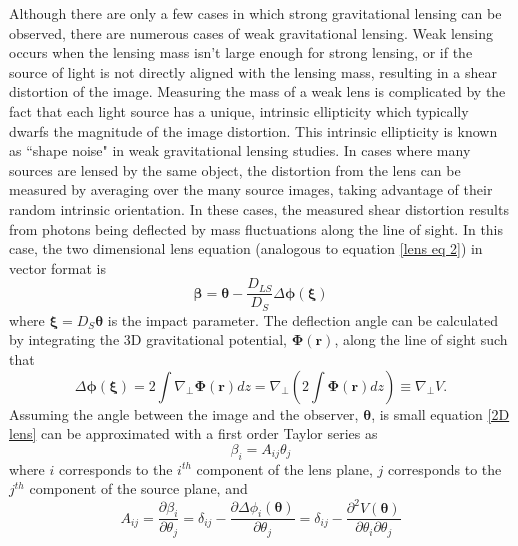 \documentclass[a4paper,12pt]{article}
\begin{document}
Although there are only a few cases in which strong gravitational lensing can be observed, there are numerous cases of weak gravitational lensing.  Weak lensing occurs when the lensing mass isn't large enough for strong lensing, or if the source of light is not directly aligned with the lensing mass, resulting in a shear distortion of the image.  Measuring the mass of a weak lens is complicated by the fact that each light source has a unique, intrinsic ellipticity which typically dwarfs the magnitude of the image distortion.  This intrinsic ellipticity is known as ``shape noise" in weak gravitational lensing studies.  In cases where many sources are lensed by the same object, the distortion from the lens can be measured by averaging over the many source images, taking advantage of their random intrinsic orientation.  In these cases, the measured shear distortion results from photons being deflected by mass fluctuations along the line of sight.  In this case, the two dimensional lens equation (analogous to equation \ref{lens eq 2}) in vector format is
\begin{equation} \label{2D lens}
\boldsymbol{\beta} = \boldsymbol{\theta} - \frac{D_{LS}}{D_S} \Delta \boldsymbol{\phi}(\boldsymbol{\xi})
\end{equation}
where $\boldsymbol{\xi}=D_{S}\boldsymbol{\theta}$ is the impact parameter.  The deflection angle can be calculated by integrating the 3D gravitational potential, $\boldsymbol{\Phi}(\mathbf{r})$, along the line of sight such that
\begin{equation} \label{3D angle}
\Delta \boldsymbol{\phi}(\boldsymbol{\xi}) = 2 \int \nabla_\perp \boldsymbol{\Phi}(\mathbf{r})dz = \nabla_\perp(2\int \boldsymbol{\Phi}(\mathbf{r}) dz) \equiv \nabla_\perp V.
\end{equation}
Assuming the angle between the image and the observer, $\boldsymbol{\theta}$, is small equation \ref{2D lens} can be approximated with a first order Taylor series as
\begin{equation} \label{lens taylor}
\beta_{i}=A_{ij} \theta_{j}
\end{equation}
where $i$ corresponds to the $i^{th}$ component of the lens plane, $j$ corresponds to the $j^{th}$ component of the source plane, and 
\begin{equation} \label{dist matrix elements}
A_{ij}=\frac{ \partial \beta_i}{\partial \theta_j} = \delta_{ij} - \frac{ \partial \Delta \phi_i( \boldsymbol{\theta}) }{\partial \theta_j} = \delta_{ij} - 
\frac{ \partial ^2 V(\boldsymbol{\theta})} {\partial \theta_i \partial \theta_j}
\end{equation}
\end{document}
